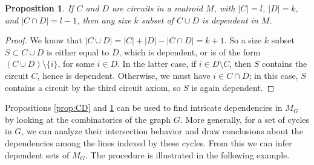 \documentclass[12pt]{extarticle}
\newtheorem{proposition}[theorem]{Proposition}
\theoremstyle{definition}
\numberwithin{theorem}{section}
\theoremstyle{plain}\newtheorem{ithm}{Theorem}
\begin{document}
\begin{proposition}
  \label{prop:containment1}
  If $C$ and $D$ are circuits in a matroid $M$, with $|C| = l$, $|D| = k$, and $|C \cap D| = l-1$, then any size $k$ subset of $C \cup D$ is dependent in $M$.
\end{proposition}

\begin{proof} 
We know that $|C \cup D| = |C| + |D| - |C \cap D| = k+1.$ 
So a size $k$ subset $S \subset C \cup D$ is either equal to $D$, which is dependent, or is of the form $(C \cup D) \setminus \{i\}$, for some $i \in D$. In the latter case, if $i \in D\setminus C$, then $S$ contains the circuit $C$, hence is dependent. Otherwise, we must have $i \in C \cap D$; in this case, $S$ contains a circuit by the third circuit axiom, so $S$ is again dependent. 
\end{proof}


 Propositions \ref{prop:CD} and \ref{prop:containment1} can be used to find intricate dependencies in $M_G$ by looking at the combinatorics of the graph $G$. More generally, for a set of cycles in $G$, we can analyze their intersection behavior and
 draw conclusions about the dependencies among the lines indexed by these cycles.
 From this we can infer dependent sets of $M_G$.  
 The procedure is illustrated in the following example.
\end{document}
